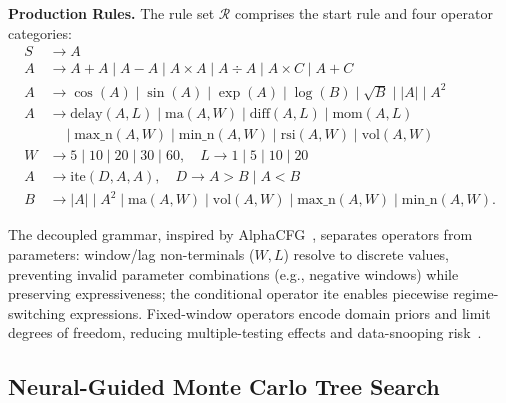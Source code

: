 \documentclass{elektr}
\theoremstyle{corollary}
\theoremstyle{lemma}
\theoremstyle{proposition}
\theoremstyle{axiom}
\theoremstyle{conjecture}
\theoremstyle{example}
\theoremstyle{definition}
\theoremstyle{remark}
\begin{document}
\textbf{Production Rules.} The rule set $\mathcal{R}$ comprises the start rule and four operator categories:
\begin{align}
\mathit{S} &\rightarrow \mathit{A} \nonumber \\
\mathit{A} &\rightarrow \mathit{A} + \mathit{A} \mid \mathit{A} - \mathit{A} \mid \mathit{A} \times \mathit{A} \mid \mathit{A} \div \mathit{A} \mid \mathit{A} \times C \mid \mathit{A} + C \nonumber \\
\mathit{A} &\rightarrow \cos(\mathit{A}) \mid \sin(\mathit{A}) \mid \exp(\mathit{A}) \mid \log(\mathit{B}) \mid \sqrt{\mathit{B}} \mid |\mathit{A}| \mid \mathit{A}^{2} \nonumber \\
\mathit{A} &\rightarrow \text{delay}(\mathit{A}, \mathit{L}) \mid \text{ma}(\mathit{A}, \mathit{W}) \mid \text{diff}(\mathit{A}, \mathit{L}) \mid \text{mom}(\mathit{A}, \mathit{L}) \nonumber \\
&\quad \mid \text{max\_n}(\mathit{A}, \mathit{W}) \mid \text{min\_n}(\mathit{A}, \mathit{W}) \mid \text{rsi}(\mathit{A}, \mathit{W}) \mid \text{vol}(\mathit{A}, \mathit{W}) \nonumber \\
\mathit{W} &\rightarrow 5 \mid 10 \mid 20 \mid 30 \mid 60, \quad \mathit{L} \rightarrow 1 \mid 5 \mid 10 \mid 20 \nonumber \\
\mathit{A} &\rightarrow \text{ite}(\mathit{D}, \mathit{A}, \mathit{A}), \quad \mathit{D} \rightarrow \mathit{A} > \mathit{B} \mid \mathit{A} < \mathit{B} \nonumber \\
\mathit{B} &\rightarrow |\mathit{A}| \mid \mathit{A}^{2} \mid \text{ma}(\mathit{A}, \mathit{W}) \mid \text{vol}(\mathit{A}, \mathit{W}) \mid \text{max\_n}(\mathit{A}, \mathit{W}) \mid \text{min\_n}(\mathit{A}, \mathit{W}).
\end{align}

The decoupled grammar, inspired by AlphaCFG~\cite{yang2026alpha}, separates operators from parameters: window/lag non-terminals ($\mathit{W}, \mathit{L}$) resolve to discrete values, preventing invalid parameter combinations (e.g., negative windows) while preserving expressiveness; the conditional operator $\text{ite}$ enables piecewise regime-switching expressions. Fixed-window operators encode domain priors and limit degrees of freedom, reducing multiple-testing effects and data-snooping risk~\cite{bailey2014deflated_sharpe}.

\subsection{Neural-Guided Monte Carlo Tree Search}
\label{subsec:mcts}
\end{document}
